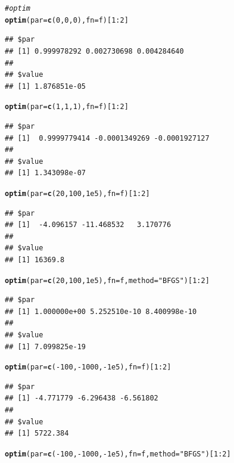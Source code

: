 \documentclass{article}\usepackage[]{graphicx}\usepackage[]{color}
\makeatletter
\newcommand{\hlnum}[1]{\textcolor[rgb]{0.686,0.059,0.569}{#1}}%
\newcommand{\hlstr}[1]{\textcolor[rgb]{0.192,0.494,0.8}{#1}}%
\newcommand{\hlcom}[1]{\textcolor[rgb]{0.678,0.584,0.686}{\textit{#1}}}%
\newcommand{\hlopt}[1]{\textcolor[rgb]{0,0,0}{#1}}%
\newcommand{\hlstd}[1]{\textcolor[rgb]{0.345,0.345,0.345}{#1}}%
\newcommand{\hlkwc}[1]{\textcolor[rgb]{0.333,0.667,0.333}{#1}}%
\newcommand{\hlkwd}[1]{\textcolor[rgb]{0.737,0.353,0.396}{\textbf{#1}}}%
\newenvironment{kframe}{%
 \def\at@end@of@kframe{}%
 \ifinner\ifhmode%
  \def\at@end@of@kframe{\end{minipage}}%
  \begin{minipage}{\columnwidth}%
 \fi\fi%
 \def\FrameCommand##1{\hskip\@totalleftmargin \hskip-\fboxsep
 \colorbox{shadecolor}{##1}\hskip-\fboxsep
     \hskip-\linewidth \hskip-\@totalleftmargin \hskip\columnwidth}%
 \MakeFramed {\advance\hsize-\width
   \@totalleftmargin\z@ \linewidth\hsize
   \@setminipage}}%
 {\par\unskip\endMakeFramed%
 \at@end@of@kframe}
\newenvironment{knitrout}{}{} %
\makeatother
\begin{document}
\begin{knitrout}
\begin{kframe}
\begin{alltt}
\hlcom{#optim}
\hlkwd{optim}\hlstd{(}\hlkwc{par} \hlstd{=} \hlkwd{c}\hlstd{(}\hlnum{0}\hlstd{,} \hlnum{0}\hlstd{,} \hlnum{0}\hlstd{),} \hlkwc{fn} \hlstd{= f)[}\hlnum{1}\hlopt{:}\hlnum{2}\hlstd{]}
\end{alltt}
\begin{verbatim}
## $par
## [1] 0.999978292 0.002730698 0.004284640
## 
## $value
## [1] 1.876851e-05
\end{verbatim}
\begin{alltt}
\hlkwd{optim}\hlstd{(}\hlkwc{par} \hlstd{=} \hlkwd{c}\hlstd{(}\hlnum{1}\hlstd{,} \hlnum{1}\hlstd{,} \hlnum{1}\hlstd{),} \hlkwc{fn} \hlstd{= f)[}\hlnum{1}\hlopt{:}\hlnum{2}\hlstd{]}
\end{alltt}
\begin{verbatim}
## $par
## [1]  0.9999779414 -0.0001349269 -0.0001927127
## 
## $value
## [1] 1.343098e-07
\end{verbatim}
\begin{alltt}
\hlkwd{optim}\hlstd{(}\hlkwc{par} \hlstd{=} \hlkwd{c}\hlstd{(}\hlnum{20}\hlstd{,} \hlnum{100}\hlstd{,} \hlnum{1e5}\hlstd{),} \hlkwc{fn} \hlstd{= f)[}\hlnum{1}\hlopt{:}\hlnum{2}\hlstd{]}
\end{alltt}
\begin{verbatim}
## $par
## [1]  -4.096157 -11.468532   3.170776
## 
## $value
## [1] 16369.8
\end{verbatim}
\begin{alltt}
\hlkwd{optim}\hlstd{(}\hlkwc{par} \hlstd{=} \hlkwd{c}\hlstd{(}\hlnum{20}\hlstd{,} \hlnum{100}\hlstd{,} \hlnum{1e5}\hlstd{),} \hlkwc{fn} \hlstd{= f,} \hlkwc{method} \hlstd{=} \hlstr{"BFGS"}\hlstd{)[}\hlnum{1}\hlopt{:}\hlnum{2}\hlstd{]}
\end{alltt}
\begin{verbatim}
## $par
## [1] 1.000000e+00 5.252510e-10 8.400998e-10
## 
## $value
## [1] 7.099825e-19
\end{verbatim}
\begin{alltt}
\hlkwd{optim}\hlstd{(}\hlkwc{par} \hlstd{=} \hlkwd{c}\hlstd{(}\hlopt{-}\hlnum{100}\hlstd{,} \hlopt{-}\hlnum{1000}\hlstd{,} \hlopt{-}\hlnum{1e5}\hlstd{),} \hlkwc{fn} \hlstd{= f)[}\hlnum{1}\hlopt{:}\hlnum{2}\hlstd{]}
\end{alltt}
\begin{verbatim}
## $par
## [1] -4.771779 -6.296438 -6.561802
## 
## $value
## [1] 5722.384
\end{verbatim}
\begin{alltt}
\hlkwd{optim}\hlstd{(}\hlkwc{par} \hlstd{=} \hlkwd{c}\hlstd{(}\hlopt{-}\hlnum{100}\hlstd{,} \hlopt{-}\hlnum{1000}\hlstd{,} \hlopt{-}\hlnum{1e5}\hlstd{),} \hlkwc{fn} \hlstd{= f,} \hlkwc{method} \hlstd{=} \hlstr{"BFGS"}\hlstd{)[}\hlnum{1}\hlopt{:}\hlnum{2}\hlstd{]}

\end{alltt}
\end{kframe}
\end{knitrout}
\end{document}
